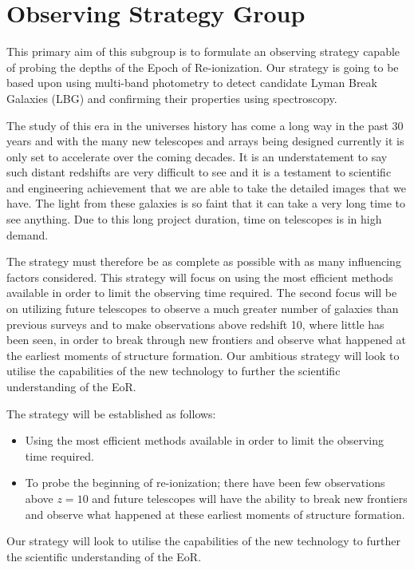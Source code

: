 \section{Observing Strategy Group} %
\label{sec:observing_strategy_group}
	This primary aim of this subgroup is to formulate an observing strategy capable of probing the depths of the Epoch of Re-ionization. Our strategy is going to be based upon using multi-band photometry to detect candidate Lyman Break Galaxies (LBG) and confirming their properties using spectroscopy.

	The study of this era in the universes history has come a long way in the past 30 years and with the many new telescopes and arrays being designed currently it is only set to accelerate over the coming decades. It is an understatement to say such distant redshifts are very difficult to see and it is a testament to scientific and engineering achievement that we are able to take the detailed images that we have. The light from these galaxies is so faint that it can take a very long time to see anything. Due to this long project duration, time on telescopes is in high demand.

	The strategy must therefore be as complete as possible with as many influencing factors considered. This strategy will focus on using the most efficient methods available in order to limit the observing time required. The second focus will be on utilizing future telescopes to observe a much greater number of galaxies than previous surveys and to make observations above redshift 10, where little has been seen, in order to break through new frontiers and observe what happened at the earliest moments of structure formation. Our ambitious strategy will look to utilise the capabilities of the new technology to further the scientific understanding of the EoR.

	The strategy will be established as follows:
	\begin{itemize}
		\item Using the most efficient methods available in order to limit the observing time required.
		\item To probe the beginning of re-ionization; there have been few observations above $z=10$ and future telescopes will have the ability to break new frontiers and observe what happened at these earliest moments of structure formation.
	\end{itemize}

	Our strategy will look to utilise the capabilities of the new technology to further the scientific understanding of the EoR.

